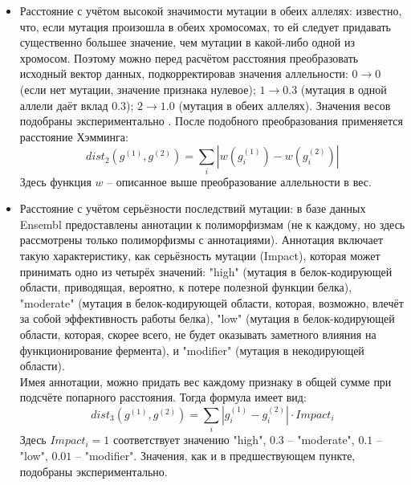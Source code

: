 \documentclass[main.tex]{subfiles}
\begin{document}
\begin{itemize}
    \item Расстояние с учётом высокой значимости мутации в обеих аллелях: известно, что, если мутация произошла в обеих хромосомах, то ей следует придавать существенно большее значение, чем мутации в какой-либо одной из хромосом. Поэтому можно перед расчётом расстояния преобразовать исходный вектор данных, подкорректировав значения аллельности: $0 \to 0$ (если нет мутации, значение признака нулевое); $ 1 \to 0.3 $ (мутация в одной аллели даёт вклад $0.3$); $ 2 \to 1.0 $ (мутация в обеих аллелях). Значения весов подобраны экспериментально \cite{ensembl}.  После подобного преобразования применяется расстояние Хэмминга:
    \begin{equation}\label{eq:allele}
        dist_2(g^{(1)}, g^{(2)}) = \sum_{i} | w(g^{(1)}_i) - w(g^{(2)}_i) |
    \end{equation}
    Здесь функция $w$ -- описанное выше преобразование аллельности в вес.

    \item Расстояние с учётом серьёзности последствий мутации: в базе данных Ensembl предоставлены аннотации к полиморфизмам (не к каждому, но здесь рассмотрены только полиморфизмы с аннотациями). Аннотация включает такую характеристику, как серьёзность мутации (Impact), которая может принимать одно из четырёх значений: "high"\hspace{0pt} (мутация в белок-кодирующей области, приводящая, вероятно, к потере полезной функции белка), "moderate"\hspace{0pt} (мутация в белок-кодирующей области, которая, возможно, влечёт за собой эффективность работы белка), "low"\hspace{0pt} (мутация в белок-кодирующей области, которая, скорее всего, не будет оказывать заметного влияния на функционирование фермента), и "modifier"\hspace{0pt} (мутация в некодирующей области). \\
    Имея аннотации, можно придать вес каждому признаку в общей сумме при подсчёте попарного расстояния. Тогда формула имеет вид:
    \begin{equation}\label{eq:impact}
        dist_3(g^{(1)}, g^{(2)}) = \sum_{i} | g^{(1)}_i - g^{(2)}_i | \cdot Impact_i
    \end{equation}
    Здесь $ Impact_i = 1 $ соответствует значению "high"\hspace{0pt}, $ 0.3 $ -- "moderate"\hspace{0pt}, $ 0.1 $ -- "low"\hspace{0pt}, $ 0.01 $ -- "modifier"\hspace{0pt}. Значения, как и в предшествующем пункте, подобраны экспериментально.


\end{itemize}
\end{document}
